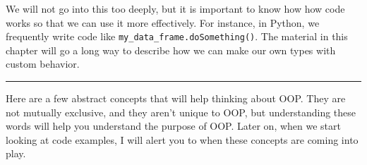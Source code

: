 \documentclass[12pt,krantz2]{krantz}
\begin{document}
We will not go into this too deeply, but it is important to know how how code works so that we can use it more effectively. For instance, in Python, we frequently write code like \texttt{my\_data\_frame.doSomething()}. The material in this chapter will go a long way to describe how we can make our own types with custom behavior.

\begin{center}\rule{0.5\linewidth}{0.5pt}\end{center}

Here are a few abstract concepts that will help thinking about OOP. They are not mutually exclusive, and they aren't unique to OOP, but understanding these words will help you understand the purpose of OOP. Later on, when we start looking at code examples, I will alert you to when these concepts are coming into play.
\end{document}

